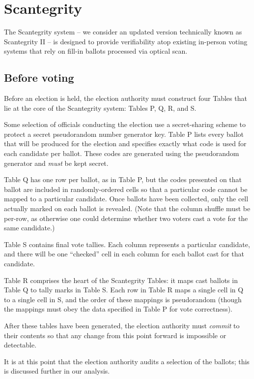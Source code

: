 \documentclass[10pt,twocolumn]{article}
\newcommand{\term}[1]{\textit{#1}}
\begin{document}
\section{Scantegrity}

The Scantegrity system \cite{scantegrity_ii} -- we consider an updated version technically known as
Scantegrity II -- is designed to provide verifiability atop existing in-person voting systems that
rely on fill-in ballots processed via optical scan.

\subsection{Before voting}

Before an election is held, the election authority must construct four Tables that lie at the core
of the Scantegrity system: Tables P, Q, R, and S.

Some selection of officials conducting the election use a secret-sharing scheme to protect a
secret pseudorandom number generator key. Table P lists every ballot that will be produced for the
election and specifies exactly what code is used for each candidate per ballot. These codes are
generated using the pseudorandom generator and \emph{must} be kept secret.

Table Q has one row per ballot, as in Table P, but the codes presented on that ballot are included
in randomly-ordered cells so that a particular code cannot be mapped to a particular candidate.
Once ballots have been collected, only the cell actually marked on each ballot is revealed. (Note
that the column shuffle must be per-row, as otherwise one could determine whether two voters
cast a vote for the same candidate.)

Table S contains final vote tallies. Each column represents a particular candidate, and there will
be one ``checked'' cell in each column for each ballot cast for that candidate.

Table R comprises the heart of the Scantegrity Tables: it maps cast ballots in Table Q to tally marks
in Table S. Each row in Table R maps a single cell in Q to a single cell in S, and the order of
these mappings is pseudorandom (though the mappings must obey the data specified in Table P for vote
correctness).

After these tables have been generated, the election authority must \term{commit} to their contents
so that any change from this point forward is impossible or detectable.

It is at this point that the election authority audits a selection of the ballots; this is discussed
further in our analysis.
\end{document}
